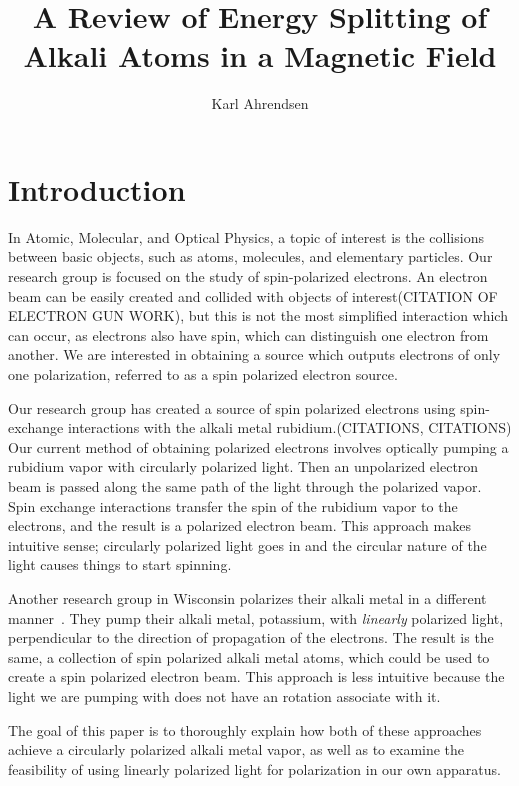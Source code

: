 \documentclass[letter,12pt]{article}
\begin{document}
\title{A Review of Energy Splitting of Alkali Atoms in a Magnetic Field}
\author{Karl Ahrendsen}
\maketitle{}

\section{Introduction}
In Atomic, Molecular,
and Optical Physics, a topic of interest is the collisions between
basic 
objects, such as atoms, molecules, and elementary particles.
Our research group is focused on the study of spin-polarized electrons. 
An electron beam can be easily created and collided
with objects of interest(CITATION OF ELECTRON GUN WORK),
but this is not the most simplified interaction
which can occur, as electrons also have spin, which can distinguish one 
electron from another. We are interested in obtaining a source which
outputs electrons of only one polarization, referred to as a spin
polarized electron source.

Our research group has created a source of spin polarized
electrons using spin-exchange interactions with the alkali metal
rubidium.(CITATIONS, CITATIONS)  Our current method of obtaining 
polarized electrons involves optically pumping a rubidium vapor
with circularly polarized light. Then an unpolarized electron beam
is passed along the same path of the light 
through the polarized vapor. Spin exchange interactions
transfer the spin of the rubidium vapor to the electrons, and the 
result is a polarized electron beam. This approach makes intuitive
sense; circularly polarized light goes in and the circular
nature of the light causes things to start spinning.

Another research group in Wisconsin polarizes their alkali metal
in a different manner~\cite{swenson}. They pump their alkali metal, 
potassium, with
\emph{linearly} polarized light, perpendicular to the direction
of propagation of the electrons. The result is the same, a collection
of spin polarized alkali metal atoms, which could be used to create
a spin polarized electron beam. This approach is less intuitive
because the light we are pumping with does not have an rotation 
associate with it.

The goal of this paper is to thoroughly
explain how both of these approaches achieve a circularly polarized
alkali metal vapor, as well 
as to examine the feasibility of using linearly polarized light
for polarization in our own apparatus.
\end{document}
